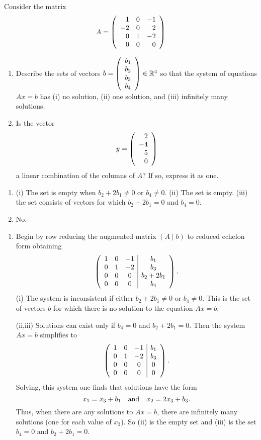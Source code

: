 \documentclass{ximera}
\author{Matthew Carr \& Martin Golubitsky}
\begin{document}
\begin{exercise}\label{mc.exerciseErr5}
Consider the matrix
\[
A=\left(\begin{array}{rrrrrrrrrrrrrrrrrr} 1 & 0 & -1 \\ -2 & 0 & 2 \\ 0 & 1 & -2 \\ 0 & 0 & 0 \end{array}\right)
\]
\begin{enumerate}[label=(\alph*)]
\item Describe the sets of vectors $b=\left(\begin{array}{rrrrrrrrrrrrrrrrrr} b_1\\b_2\\b_3\\b_4 \end{array}\right)\in\mathbb{R}^4$ so that the system of equations $Ax=b$ has (i) no solution, (ii) one solution, and (iii) infinitely many solutions.
\item Is the vector 
\[ 
y=\left(\begin{array}{rrrrrrrrrrrrrrrrrr} 2\\-4\\5 \\ 0 \end{array}\right)
\]
a linear combination of the columns of $A$? If so, express it as one.
\end{enumerate}


\begin{solution}


\ans\begin{enumerate}[label=(\alph*)]
\item (i) The set is empty when $b_2+2b_1\neq 0$ or $b_4\neq 0$. (ii) The set is empty.  (iii) the set consists of vectors for which $b_2+2b_1 = 0$ and $b_4 = 0$.
\item No.
\end{enumerate}

\soln

\begin{enumerate}[label=(\alph*)]
\item Begin by row reducing the augmented matrix $\left(A\mid b\right)$ to reduced echelon form obtaining
\[
\left(\begin{array}{ccc|c} 
1 & 0 & -1 & b_1 \\ 
0 & 1 & -2 & b_3 \\ 
0 & 0 & 0 & b_2+2b_1 \\ 
0 & 0 & 0 & b_4
\end{array}\right)\ldotp
\]
(i) The system is inconsistent if either $b_2+2b_1\neq 0$ or $b_4 \neq 0$. This is the set of vectors $b$ for which there is no solution to the equation $Ax=b$.

(ii,iii)  Solutions can exist only if  $b_4 = 0$ and $b_2 + 2b_1 = 0$. Then the system $Ax = b$  simplifies to 
\[
\left(\begin{array}{ccc|c}
1 & 0 & -1 & b_1\\  
0 & 1 & -2 & b_3 \\ 
0 & 0 & 0 & 0\\ 
0 & 0 & 0 & 0
\end{array}\right)\ldotp
\]
Solving, this system one finds that solutions have the form   
\[
x_1 = x_3 + b_1 \quad\mbox{and}\quad x_2 = 2x_3 + b_3.
\] 
Thus, when there are any solutions to $Ax=b$, there are infinitely many solutions (one for each value of $x_3$).  So (ii) is the empty set and (iii) is the set  $b_4=0$ and $b_2 + 2b_1 = 0$.


\end{enumerate}
\end{solution}
\end{exercise}
\end{document}
